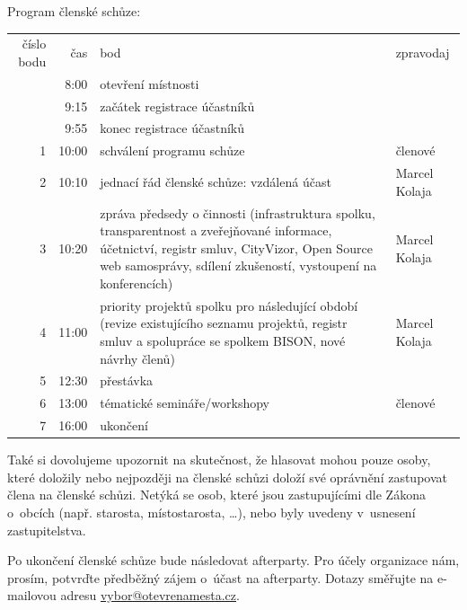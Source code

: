 \documentclass[a4paper,12pt]{letter}
\begin{document}
\begin{letter}{}{}
Program členské schůze:

\begin{tabular}{rrp{}l}
číslo bodu & čas & bod & zpravodaj\\
& 8:00 & otevření místnosti & \\
& 9:15 & začátek registrace účastníků & \\
& 9:55 & konec registrace účastníků & \\
1 & 10:00 & schválení programu schůze & členové\\
2 & 10:10 & jednací řád členské schůze: vzdálená účast & Marcel Kolaja\\
3 & 10:20 & zpráva předsedy o činnosti (infrastruktura spolku, transparentnost
a zveřejňované informace, účetnictví, registr smluv, CityVizor, Open Source web
samosprávy, sdílení zkušeností, vystoupení na konferencích) & Marcel Kolaja\\
4 & 11:00 & priority projektů spolku pro následující období (revize existujícího
seznamu projektů, registr smluv a spolupráce se spolkem BISON, nové návrhy
členů) & Marcel Kolaja\\
5 & 12:30 & přestávka & \\
6 & 13:00 & tématické semináře/workshopy & členové\\
7 & 16:00 & ukončení\\
\end{tabular}

Také si dovolujeme upozornit na skutečnost, že hlasovat mohou pouze osoby, které
doložily nebo nejpozději na členské schůzi doloží své oprávnění zastupovat člena
na členské schůzi. Netýká se osob, které jsou zastupujícími dle Zákona o~obcích
(např. starosta, místostarosta, \ldots), nebo byly uvedeny v~usnesení
zastupitelstva.

Po ukončení členské schůze bude následovat afterparty. Pro účely organizace nám,
prosím, potvrďte předběžný zájem o~účast na afterparty. Dotazy směřujte na
e-mailovou adresu \href{mailto:vybor@otevrenamesta.cz}{vybor@otevrenamesta.cz}.


\end{letter}
\end{document}

